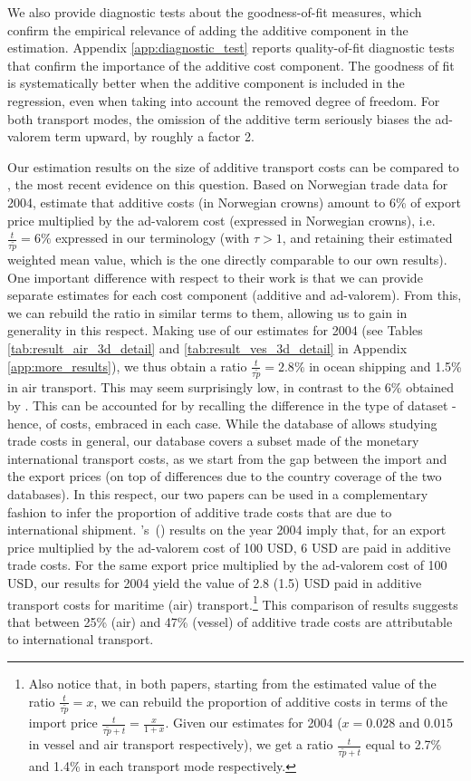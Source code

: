\documentclass[a4paper,11pt]{article}
\newcommand\cites[1]{\citeauthor{#1}'s\ (\citeyear{#1})}
\begin{document}
We also provide diagnostic tests about the goodness-of-fit measures, which confirm the empirical relevance of adding the additive component in the estimation. Appendix \ref{app:diagnostic_test} reports quality-of-fit diagnostic tests that confirm the importance of the additive cost component.
The goodness of fit is systematically better when the additive component is included in the regression, even when taking into account the removed degree of freedom. For both transport modes, the omission of the additive term seriously biases the ad-valorem term upward, by roughly a factor 2.\smallskip


Our estimation results on the size of additive transport costs can be compared to \cite{Irrazabal_2015}, the most recent evidence on this question.
Based on Norwegian trade data for 2004, \cite{Irrazabal_2015} estimate that additive costs (in Norwegian crowns) amount to 6\% of export price multiplied by the ad-valorem cost (expressed in Norwegian crowns), i.e.
$\frac{t}{\tau\widetilde{p}}=6\%$ expressed in our terminology (with $\tau>1$, and retaining their estimated weighted mean value, which is the one directly comparable to our own results).
One important difference with respect to their work is that we can provide separate estimates for each cost component (additive and ad-valorem).
From this, we can rebuild the ratio in similar terms to them, allowing us to gain in generality in this respect.
Making use of our estimates for 2004 (see Tables \ref{tab:result_air_3d_detail} and \ref{tab:result_ves_3d_detail} in Appendix \ref{app:more_results}), we thus obtain a ratio $\frac{t}{\tau\widetilde{p}}=2.8\%$ in ocean shipping and 1.5\% in air transport.
This may seem surprisingly low, in contrast to the 6\% obtained by \cite{Irrazabal_2015}.
This can be accounted for by recalling the difference in the type of dataset - hence, of costs, embraced in each case.
While the database of \cite{Irrazabal_2015} allows studying trade costs in general, our database covers a subset made of the monetary international transport costs, as we start from the gap between the import and the export prices (on top of differences due to the country coverage of the two databases).
In this respect, our two papers can be used in a complementary fashion to infer the proportion of additive trade costs that are due to international shipment.
\cites{Irrazabal_2015} results on the year 2004 imply that, for an export price multiplied by the ad-valorem cost of 100 USD, 6 USD are paid in additive trade costs.
For the same export price multiplied by the ad-valorem cost of 100 USD, our results for 2004 yield the value of 2.8 (1.5) USD paid in additive transport costs for maritime (air) transport.\footnote{Also notice that, in both papers, starting from the estimated value of the ratio $\frac{t}{\tau \widetilde{p}}= x$, we can rebuild the proportion of additive costs in terms of the import price $\frac{t}{\tau \widetilde{p} + t} = \frac{x}{1+x}$.
Given our estimates for 2004 ($x = 0.028$ and $0.015$ in vessel and air transport respectively), we get a ratio $\frac{t}{\tau \widetilde{p} + t}$ equal to 2.7\% and 1.4\% in each transport mode respectively.} This comparison of results suggests that between 25\% (air) and 47\% (vessel) of additive trade costs are attributable to international transport.
\end{document}
